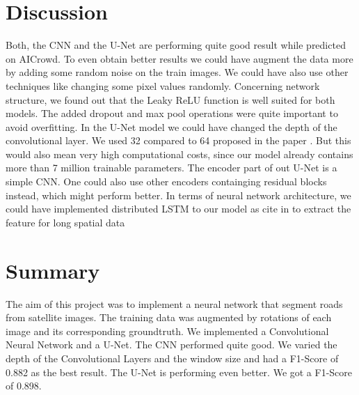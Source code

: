 \documentclass[10pt,conference,compsocconf]{IEEEtran}
\begin{document}
\vspace{0.5cm}
\section{Discussion}
\vspace{0.3cm}
Both, the CNN and the U-Net are performing quite good result while predicted on AICrowd. To even obtain better results we could have augment the data more by adding some random noise on the train images. We could have also use other techniques like changing some pixel values randomly. 
Concerning network structure, we found out that the Leaky ReLU function is well suited for both models. The added dropout and max pool operations were quite important to avoid overfitting. In the U-Net model we could have changed the depth of the convolutional layer. We used 32 compared to 64 proposed in the paper \cite{unet}. But this would also mean very high computational costs, since our model already contains more than 7 million trainable parameters. The encoder part of out U-Net is a simple CNN. One could also use other encoders containging residual blocks instead, which might perform better. In terms of neural network architecture, we could have implemented distributed LSTM to our model as cite in \cite{lstm} to extract the feature for long spatial data 

\vspace{0.5cm}
\section{Summary}
\vspace{0.3cm}
The aim of this project was to implement a neural network that segment roads from satellite images. The training data was augmented by rotations of each image and its corresponding groundtruth. We implemented a Convolutional Neural Network and a U-Net. The CNN performed quite good. We varied the depth of the Convolutional Layers and the window size and had a F1-Score of 0.882 as the best result. The U-Net is performing even better. We got a F1-Score of 0.898.  




\vspace{1cm}


\end{document}
